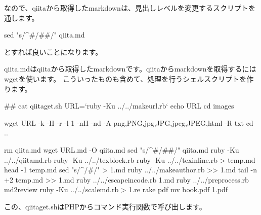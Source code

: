 なので、qiitaから取得したmarkdownは、見出しレベルを変更するスクリプトを通します。

\begin{reviewemlist}
sed "s/\textasciicircum{}\#/\#\#/"  qiita.md
\end{reviewemlist}

とすれば良いことになります。

qiita.mdはqiitaから取得したmarkdownです。qiitaからmarkdownを取得するにはwgetを使います。
こういったものも含めて、処理を行うシェルスクリプトを作ります。

\begin{reviewemlist}
\#\# cat qiitaget.sh
URL=`ruby {-}Ku ../../makeurl.rb`
echo \textdollar{}URL
cd images

wget \textdollar{}URL {-}k {-}H {-}r {-}l 1 {-}nH {-}nd {-}A png,PNG,jpg,JPG,jpeg,JPEG,html  {-}R txt
cd ..

rm qiita.md
wget \textdollar{}URL.md {-}O qiita.md
sed "s/\textasciicircum{}\#/\#\#/"  qiita.md \textbar{} ruby {-}Ku ../../qiitamd.rb \textbar{} ruby {-}Ku ../../texblock.rb \textbar{} ruby {-}Ku ../../texinline.rb   \textgreater{} temp.md
head {-}1 temp.md \textbar{} sed "s/\textasciicircum{}/\#/" \textgreater{} \textdollar{}1.md
ruby  ../../makeauthor.rb  \textgreater{}\textgreater{} \textdollar{}1.md
tail {-}n +2 temp.md \textgreater{}\textgreater{} \textdollar{}1.md
ruby ../../escapeincode.rb \textdollar{}1.md \textbar{} ruby ../../preprocess.rb \textbar{}  md2review \textbar{} ruby {-}Ku ../../scalemd.rb \textgreater{} \textdollar{}1.re
rake pdf
mv book.pdf \textdollar{}1.pdf

\end{reviewemlist}

この、qiitaget.shはPHPからコマンド実行関数で呼び出します。

